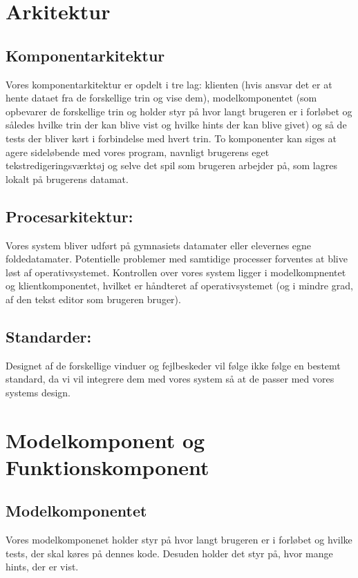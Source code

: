\documentclass[10pt,a4paper,danish]{article}
\begin{document}
\section{Arkitektur}

\subsection{Komponentarkitektur}
Vores komponentarkitektur er opdelt i tre lag: klienten 
(hvis ansvar det er at hente dataet fra de forskellige trin og vise dem), modelkomponentet
(som opbevarer de forskellige trin og holder styr på hvor langt brugeren er i forløbet
og således hvilke trin der kan blive vist og hvilke hints der kan blive givet)
og så de tests der bliver kørt i forbindelse med hvert trin. To komponenter kan 
siges at agere sideløbende med vores program, navnligt brugerens eget tekstredigeringsværktøj
og selve det spil som brugeren arbejder på, som lagres lokalt på brugerens datamat. 

\subsection{Procesarkitektur:} Vores system bliver udført på gymnasiets datamater eller
elevernes egne foldedatamater. Potentielle 
problemer med samtidige processer forventes at blive løst af operativsystemet. 
Kontrollen over vores system ligger i modelkompnentet  og klientkomponentet, hvilket er 
håndteret af operativsystemet (og i mindre grad, af den tekst editor som brugeren 
bruger). 

\subsection{Standarder:} Designet af de forskellige vinduer og fejlbeskeder vil følge ikke følge 
en bestemt standard, da vi vil integrere dem med vores system så at de passer med 
vores systems design. 

\section{Modelkomponent og Funktionskomponent}
\subsection{Modelkomponentet}
Vores modelkomponenet holder styr på hvor langt brugeren er i forløbet og
hvilke tests, der skal køres på dennes kode. Desuden holder det styr på, hvor
mange hints, der er vist.
\end{document}

